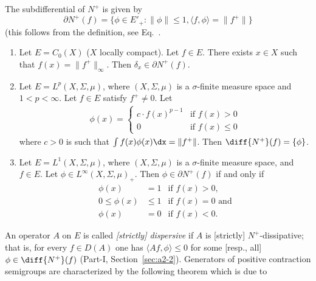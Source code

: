 The subdifferential of\/ $N^{+}$ is given by
\begin{equation}\label{eq:c2-1.2}
	\partial N^{+}(f) = \{\phi \in E'_{+} \colon \|\phi\| \leq 1, \langle f,\phi \rangle = \|f^{+}\|\}
\end{equation}
(this follows from the definition, see Eq.~.
\begin{examples}\label{ex:c2-1.1}
%
\begin{enumerate}[\upshape (i), wide, labelindent=.25em]  %
\item \label{ex:c2-1.1-1}
Let $E = C_{0}(X)$ ($X$ locally compact). 
Let $f \in E$.
There exists $x \in X$ such that $f(x) = \|f^{+}\|_{\infty}$. 
Then $\delta_{x} \in \partial N^{+}(f)$.
\item \label{ex:c2-1.1-2}
Let $E = L^{p}(X,\Sigma,\mu)$, where $(X,\Sigma,\mu)$ is a $\sigma$-finite measure space and $1 < p < \infty$. Let $f \in E$ satisfy $f^{+} \neq 0$. Let
\begin{align*}
\phi(x) = 
    \begin{cases}
        c \cdot f(x)^{p-1} & \text{if } f(x) > 0 \\
        0 & \text{if } f(x) \leq 0
    \end{cases}
\end{align*}
where $c > 0$ is such that $\int f(x) \phi(x) \dx = \|f^{+}\|$.
Then $\diff{N^{+}}(f) = \{\phi\}$.
\item \label{ex:c2-1.1-3}
Let $E = L^{1}(X,\Sigma,\mu)$, where $(X,\Sigma,\mu)$ is a $\sigma$-finite measure space, and $f \in E$. Let $\phi \in L^{\infty}(X,\Sigma,\mu)_{+}$. Then $\phi \in \partial N^{+}(f)$ if and only if
\begin{align*}
\phi(x) &= 1 & \text{if } f(x) > 0, \\
0 \leq \phi(x) &\leq 1 & \text{if } f(x) = 0 \text{ and} \\
\phi(x) &= 0 & \text{if } f(x) < 0.
\end{align*}
\end{enumerate}
\end{examples}
An operator $A$ on $E$ is called \emph{[strictly] dispersive} if\/ $A$ is [strictly] $N^{+}$-dissipative; that is, for every $f \in D(A)$ one has $\langle Af,\phi \rangle \leq 0$ for some [resp., all] $\phi \in \diff{N^{+}}(f)$ (\cf Part-I, Section~\ref{sec:a2-2}). 
Generators of positive contraction semigroups are characterized by the following theorem which is due to 
